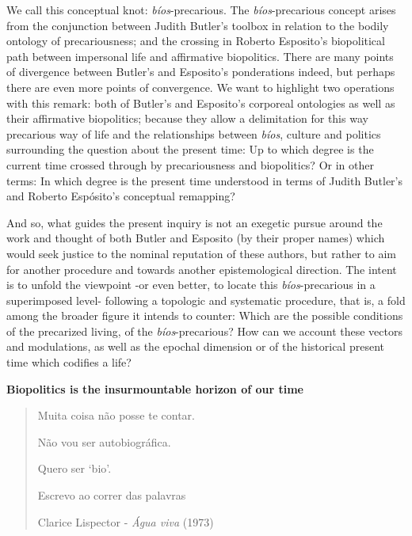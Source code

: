 \documentclass[a4paper,]{scrartcl}
\begin{document}
We call this conceptual knot: \emph{bíos}-precarious. The
\emph{bíos}-precarious concept arises from the conjunction between
Judith Butler's toolbox in relation to the bodily ontology of
precariousness; and the crossing in Roberto Esposito's biopolitical path
between impersonal life and affirmative biopolitics. There are many
points of divergence between Butler's and Esposito's ponderations
indeed, but perhaps there are even more points of convergence. We want
to highlight two operations with this remark: both of Butler's and
Esposito's corporeal ontologies as well as their affirmative
biopolitics; because they allow a delimitation for this way precarious
way of life and the relationships between \emph{bíos}, culture and
politics surrounding the question about the present time: Up to which
degree is the current time crossed through by precariousness and
biopolitics? Or in other terms: In which degree is the present time
understood in terms of Judith Butler's and Roberto Espósito's conceptual
remapping?

And so, what guides the present inquiry is not an exegetic pursue around
the work and thought of both Butler and Esposito (by their proper names)
which would seek justice to the nominal reputation of these authors, but
rather to aim for another procedure and towards another epistemological
direction. The intent is to unfold the viewpoint -or even better, to
locate this \emph{bíos}-precarious in a superimposed level- following a
topologic and systematic procedure, that is, a fold among the broader
figure it intends to counter: Which are the possible conditions of the
precarized living, of the \emph{bíos}-precarious? How can we account
these vectors and modulations, as well as the epochal dimension or of
the historical present time which codifies a life?

\textbf{Biopolitics is the insurmountable horizon of our time}

\begin{quote}
Muita coisa não posse te contar.

Não vou ser autobiográfica.

Quero ser `bio'.

Escrevo ao correr das palavras

Clarice Lispector - \emph{Água viva} (1973)
\end{quote}
\end{document}
